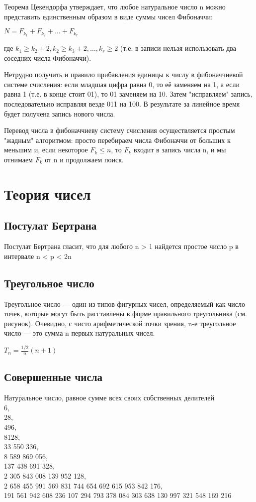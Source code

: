 \documentclass[a4paper]{article}
\begin{document}
\begin{multicols*}{2}
		 Теорема Цекендорфа утверждает, что любое натуральное число n можно представить единственным образом в виде суммы чисел Фибоначчи:
		 
		 $N = F_{k_1} + F_{k_2} + \ldots + F_{k_r}$
		 
		 где $k_1 \ge k_2+2, k_2 \ge k_3+2, \ldots, k_r \ge 2$ (т.е. в записи нельзя использовать два соседних числа Фибоначчи).
		 
		 Нетрудно получить и правило прибавления единицы к числу в фибоначчиевой системе счисления: если младшая цифра равна 0, то её заменяем на 1, а если равна 1 (т.е. в конце стоит 01), то 01 заменяем на 10. Затем "исправляем" запись, последовательно исправляя везде 011 на 100. В результате за линейное время будет получена запись нового числа.
		 
		 Перевод числа в фибоначчиеву систему счисления осуществляется простым "жадным" алгоритмом: просто перебираем числа Фибоначчи от больших к меньшим и, если некоторое $F_k \le n$, то $F_k$ входит в запись числа n, и мы отнимаем $F_k$ от n и продолжаем поиск.
		 
		  \section{Теория чисел}
		  \subsection{Постулат Бертрана}
		  Постулат Бертрана гласит, что для любого n > 1 найдется простое число p в интервале n < p < 2n
		  \subsection{Треугольное число}
		  Треугольное число — один из типов фигурных чисел, определяемый как число точек, которые могут быть расставлены в форме правильного треугольника (см. рисунок). Очевидно, с чисто арифметической точки зрения, n-е треугольное число — это сумма n первых натуральных чисел.
		  
		  $T_n = \frac{1/2}n(n+1)$
		  \subsection{Совершенные числа}
		  Натуральное число, равное сумме всех своих собственных делителей\\
		  6,\\
		  28,\\
		  496,\\
		  8128,\\
		  33 550 336,\\
		  8 589 869 056,\\
		  137 438 691 328,\\
		  2 305 843 008 139 952 128,\\
		  2 658 455 991 569 831 744 654 692 615 953 842 176,\\
		  191 561 942 608 236 107 294 793 378 084 303 638 130 997 321 548 169 216

\end{multicols*}
\end{document}
